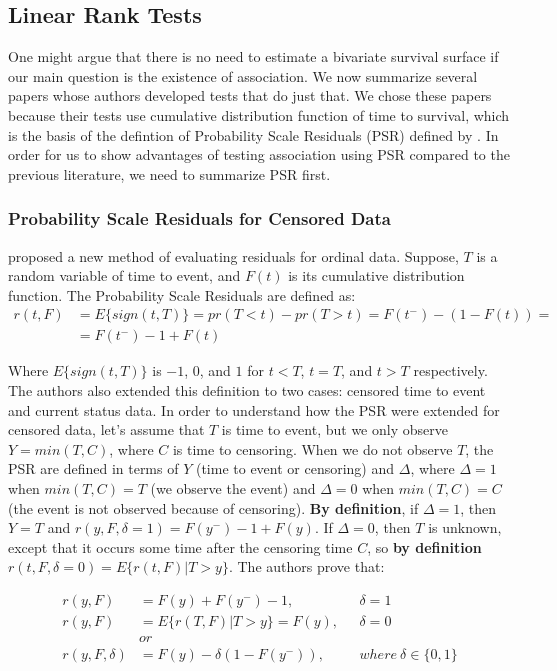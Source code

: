 \documentclass[]{article}
\begin{document}
\subsection{Linear Rank Tests}
One might argue that there is no need to estimate a bivariate survival surface if our main question is the existence of association. We now summarize several papers whose authors developed tests that do just that. We chose these papers because their tests use cumulative distribution function of time to survival, which is the basis of the defintion of Probability Scale Residuals (PSR) defined by \cite{li2012new}. In order for us to show advantages of testing association using PSR compared to the previous literature, we need to summarize PSR first.

\subsubsection{Probability Scale Residuals for Censored Data}

\cite{li2012new} proposed a new method of evaluating residuals for ordinal data. Suppose, $T$ is a random variable of time to event, and $F(t)$ is its cumulative distribution function. The Probability Scale Residuals are defined as:\\
$$
\begin{aligned}
	r(t,F) &= E\{sign(t,T)\} = pr(T < t) - pr(T > t) = F(t^-) - (1-F(t)) =\\
	 &=F(t^-) - 1 + F(t)
	\end{aligned}
$$

Where $E\{sign(t,T)\}$ is $-1$, $0$, and $1$ for $t<T$, $t=T$, and $t>T$ respectively.
The authors also extended this definition to two cases: censored time to event and current status data. In order to understand how the PSR were extended for censored data, let's assume that $T$ is time to event, but we only observe $Y = min(T, C)$, where $C$ is time to censoring. When we do not observe $T$, the PSR are defined in terms of $Y$ (time to event or censoring) and $\Delta$, where $\Delta = 1$ when $min(T, C)=T$ (we observe the event) and $\Delta =0$ when $min(T, C)=C$ (the event is not observed because of censoring). \textbf{By definition}, if $\Delta = 1$, then $Y=T$ and $r(y,F, \delta=1) = F(y^-) - 1 + F(y)$. If $\Delta = 0$, then $T$ is unknown, except that it occurs some time after the censoring time $C$, so \textbf{by definition} $r(t,F, \delta=0) = E\{r(t,F)|T>y\}$. The authors prove that:

	$$
	\begin{aligned}
		r(y, F) &= F(y) + F(y^-) - 1,~~~&\delta = 1 \\
		r(y, F) &= E\{r(T,F)|T>y\} = F(y) ,~~~&\delta = 0 \\
		&or\\
    r(y, F, \delta) &= F(y) - \delta(1 - F(y^-)),~~~&where~\delta \in \{0,1\}
	\end{aligned}
	$$
\end{document}
